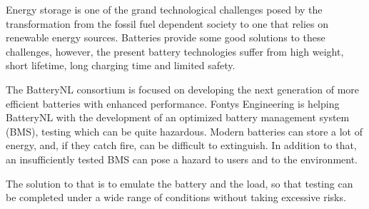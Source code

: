 Energy storage is one of the grand technological challenges posed by the transformation from the fossil fuel dependent society to one that relies on renewable energy sources. Batteries provide some good solutions to these challenges, however, the present battery technologies suffer from high weight, short lifetime, long charging time and limited safety.

The BatteryNL consortium is focused on developing the next generation of more efficient batteries with enhanced performance. Fontys Engineering is helping BatteryNL with the development of an optimized battery management system (BMS), testing which can be quite hazardous. Modern batteries can store a lot of energy, and, if they catch fire, can be difficult to extinguish. In addition to that, an insufficiently tested BMS can pose a hazard to users and to the environment. 

The solution to that is to emulate the battery and the load, so that testing can be completed under a wide range of conditions without taking excessive risks. 

